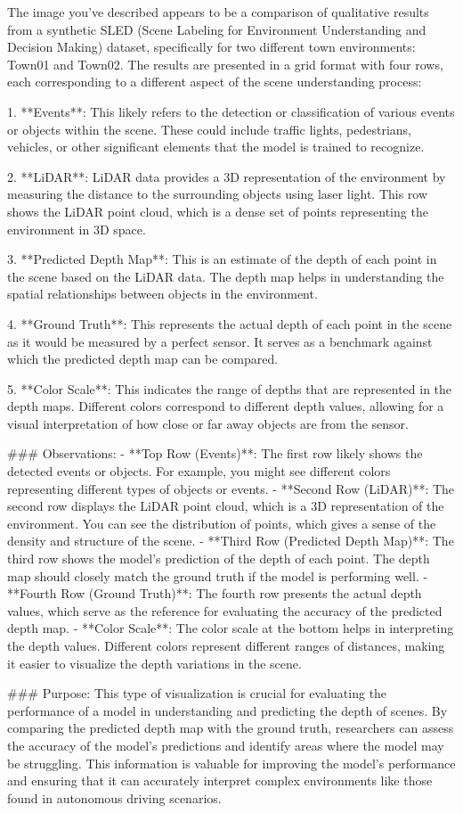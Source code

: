 The image you've described appears to be a comparison of qualitative results from a synthetic SLED (Scene Labeling for Environment Understanding and Decision Making) dataset, specifically for two different town environments: Town01 and Town02. The results are presented in a grid format with four rows, each corresponding to a different aspect of the scene understanding process:

1. **Events**: This likely refers to the detection or classification of various events or objects within the scene. These could include traffic lights, pedestrians, vehicles, or other significant elements that the model is trained to recognize.

2. **LiDAR**: LiDAR data provides a 3D representation of the environment by measuring the distance to the surrounding objects using laser light. This row shows the LiDAR point cloud, which is a dense set of points representing the environment in 3D space.

3. **Predicted Depth Map**: This is an estimate of the depth of each point in the scene based on the LiDAR data. The depth map helps in understanding the spatial relationships between objects in the environment.

4. **Ground Truth**: This represents the actual depth of each point in the scene as it would be measured by a perfect sensor. It serves as a benchmark against which the predicted depth map can be compared.

5. **Color Scale**: This indicates the range of depths that are represented in the depth maps. Different colors correspond to different depth values, allowing for a visual interpretation of how close or far away objects are from the sensor.

### Observations:
- **Top Row (Events)**: The first row likely shows the detected events or objects. For example, you might see different colors representing different types of objects or events.
- **Second Row (LiDAR)**: The second row displays the LiDAR point cloud, which is a 3D representation of the environment. You can see the distribution of points, which gives a sense of the density and structure of the scene.
- **Third Row (Predicted Depth Map)**: The third row shows the model's prediction of the depth of each point. The depth map should closely match the ground truth if the model is performing well.
- **Fourth Row (Ground Truth)**: The fourth row presents the actual depth values, which serve as the reference for evaluating the accuracy of the predicted depth map.
- **Color Scale**: The color scale at the bottom helps in interpreting the depth values. Different colors represent different ranges of distances, making it easier to visualize the depth variations in the scene.

### Purpose:
This type of visualization is crucial for evaluating the performance of a model in understanding and predicting the depth of scenes. By comparing the predicted depth map with the ground truth, researchers can assess the accuracy of the model's predictions and identify areas where the model may be struggling. This information is valuable for improving the model's performance and ensuring that it can accurately interpret complex environments like those found in autonomous driving scenarios.